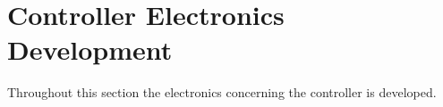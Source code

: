 \section{Controller Electronics Development}
\label{sec:controller_board}
Throughout this section the electronics concerning the controller is developed.




